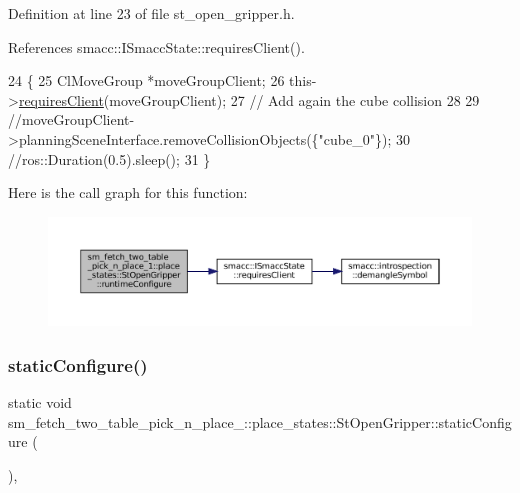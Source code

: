 Definition at line 23 of file st\+\_\+open\+\_\+gripper.\+h.



References smacc\+::\+I\+Smacc\+State\+::requires\+Client().


\begin{DoxyCode}
24     \{
25         ClMoveGroup *moveGroupClient;
26         this->\hyperlink{classsmacc_1_1ISmaccState_a7f95c9f0a6ea2d6f18d1aec0519de4ac}{requiresClient}(moveGroupClient);
27         \textcolor{comment}{// Add again the cube collision}
28 
29         \textcolor{comment}{//moveGroupClient->planningSceneInterface.removeCollisionObjects(\{"cube\_0"\});}
30         \textcolor{comment}{//ros::Duration(0.5).sleep();}
31     \}
\end{DoxyCode}
Here is the call graph for this function\+:
\nopagebreak
\begin{figure}[H]
\begin{center}
\leavevmode
\includegraphics[width=350pt]{structsm__fetch__two__table__pick__n__place__1_1_1place__states_1_1StOpenGripper_aee8c0464ce934e57ac581b8dbf384cd1_cgraph}
\end{center}
\end{figure}
\mbox{\label{structsm__fetch__two__table__pick__n__place__1_1_1place__states_1_1StOpenGripper_ab948c66ace6e1e3fe22e6b34f4ae2668}} 
\subsubsection{\texorpdfstring{static\+Configure()}{staticConfigure()}}
{\footnotesize\ttfamily static void sm\+\_\+fetch\+\_\+two\+\_\+table\+\_\+pick\+\_\+n\+\_\+place\+\_\+::place\+\_\+states\+::\+St\+Open\+Gripper\+::static\+Configure (\begin{DoxyParamCaption}{ }\end{DoxyParamCaption})\hspace{0.3cm}{\ttfamily [inline]}, {\ttfamily [static]}}



